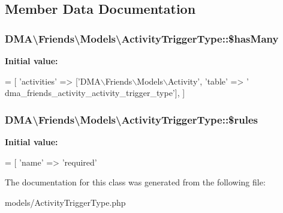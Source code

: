 \subsection{Member Data Documentation}
\hypertarget{classDMA_1_1Friends_1_1Models_1_1ActivityTriggerType_a044c92db10c394ad4d31f4383e277769}{
\subsubsection[{\$has\-Many}]{\setlength{\rightskip}{0pt plus 5cm}D\-M\-A\textbackslash{}\-Friends\textbackslash{}\-Models\textbackslash{}\-Activity\-Trigger\-Type\-::\$has\-Many}}\label{classDMA_1_1Friends_1_1Models_1_1ActivityTriggerType_a044c92db10c394ad4d31f4383e277769}
{\bfseries Initial value\-:}
\begin{DoxyCode}
= [
        \textcolor{stringliteral}{'activities'} => [\textcolor{stringliteral}{'DMA\(\backslash\)Friends\(\backslash\)Models\(\backslash\)Activity'}, \textcolor{stringliteral}{'table'} => \textcolor{stringliteral}{'
      dma\_friends\_activity\_activity\_trigger\_type'}],
    ]
\end{DoxyCode}
\hypertarget{classDMA_1_1Friends_1_1Models_1_1ActivityTriggerType_ad12f065142d4b07860d55f2a028b17d9}{
\subsubsection[{\$rules}]{\setlength{\rightskip}{0pt plus 5cm}D\-M\-A\textbackslash{}\-Friends\textbackslash{}\-Models\textbackslash{}\-Activity\-Trigger\-Type\-::\$rules}}\label{classDMA_1_1Friends_1_1Models_1_1ActivityTriggerType_ad12f065142d4b07860d55f2a028b17d9}
{\bfseries Initial value\-:}
\begin{DoxyCode}
= [ 
        \textcolor{stringliteral}{'name'} => \textcolor{stringliteral}{'required'}
\end{DoxyCode}


The documentation for this class was generated from the following file\-:\begin{DoxyCompactItemize}
\item 
models/Activity\-Trigger\-Type.\-php\end{DoxyCompactItemize}
